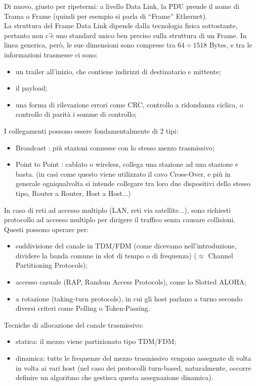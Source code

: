 \noindent Di nuovo, giusto per ripetermi: a livello Data Link, la PDU prende il nome di Trama o Frame (quindi per esempio si parla di ``Frame'' Ethernet).\\
\noindent La struttura del Frame Data Link dipende dalla tecnologia fisica sottostante, pertanto non c'è uno standard unico ben preciso sulla struttura di un Frame. In linea generica, però, le sue dimensioni sono comprese tra $64\div 1518$ Bytes, e tra le informazioni trasmesse ci sono:
\begin{itemize}
    \item un trailer all'inizio, che contiene indirizzi di destinatario e mittente;
    \item il payload;
    \item una forma di rilevazione errori come CRC, controllo a ridondanza ciclica, o controllo di parità i somme di controllo;
\end{itemize}

\noindent I collegamenti possono essere fondamentalmente di 2 tipi:
\begin{itemize}
    \item Broadcast : più stazioni connesse con lo stesso mezzo trasmissivo;
    \item Point to Point : cablato o wireless, collega una stazione ad una stazione e basta. (in casi come questo viene utilizzato il cavo Cross-Over, e più in generale ogniqualvolta si intende collegare tra loro due dispositivi dello stesso tipo, Router a Router, Host a Host...)
\end{itemize}

\noindent In caso di reti ad accesso multiplo (LAN, reti via satellite...), sono richiesti protocollo ad accesso multiplo per dirigere il traffico senza causare collisioni. Questi possono operare per:
\begin{itemize}
    \item suddivisione del canale in TDM/FDM (come dicevamo nell'introduzione, dividere la banda comune in slot di tempo o di frequenza) ($\approx$ Channel Partitioning Protocols);
    \item accesso casuale (RAP, Random Access Protocols), come lo Slotted ALOHA;
    \item a rotazione (taking-turn protocols), in cui gli host parlano a turno secondo diversi criteri come Polling o Token-Passing. 
\end{itemize}

\noindent Tecniche di allocazione del canale trasmissivo:
\begin{itemize}
    \item statica: il mezzo viene partizionato tipo TDM/FDM;
    \item dinamica: tutte le frequenze del mezzo trasmissivo vengono assegnate di volta in volta ai vari host (nel caso dei protocolli turn-based, naturalmente, occorre definire un algoritmo che gestisca questa assegnazione dinamica).
\end{itemize}

